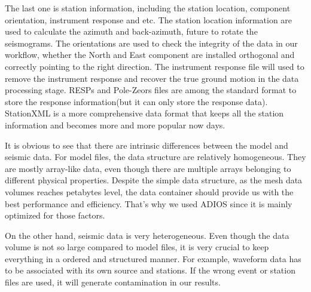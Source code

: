 The last one is station information, including the station location, component orientation,
instrument response and etc. The station location information are used to calculate the 
azimuth and back-azimuth, future to rotate the seismograms. The orientations are used
to check the integrity of the data in our workflow, whether the North and East component are installed
orthogonal and correctly pointing to the right direction. The instrument response
file will used to remove the instrument response and recover the true ground motion
in the data processing stage. RESPs and Pole-Zeors files are among the standard
format to store the response information(but it can only store the response data).
StationXML is a more comprehensive data format that keeps all the station information
and becomes more and more popular now days.

It is obvious to see that there are intrinsic differences between the model and seismic data.
For model files, the data structure are relatively homogeneous. They are mostly
array-like data, even though there are multiple arrays belonging to different physical
properties. Despite the simple data structure, as the mesh data volumes reaches petabytes level,
the data container should provide us with the best performance
and efficiency. That's why we used ADIOS since it is mainly optimized for those
factors.

On the other hand, seismic data is very heterogeneous. Even
though the data volume is not so large compared to model files, it is very crucial to
keep everything in a ordered and structured manner. For example, 
waveform data has to be associated with its own source and stations. If the wrong
event or station files are used, it will generate contamination in our results.

